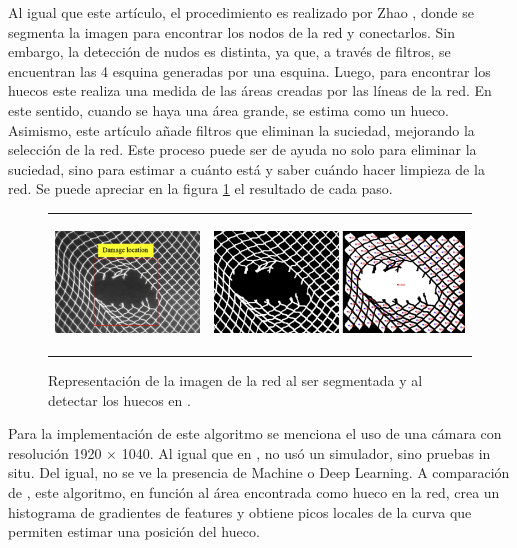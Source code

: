 Al igual que este artículo, el procedimiento es realizado por Zhao \cite{cite:Zhao}, donde se segmenta la imagen para encontrar los nodos de la red y conectarlos. Sin embargo, la detección de nudos es distinta, ya que, a través de filtros, se encuentran las 4 esquina generadas por una esquina. Luego, para encontrar los huecos este realiza una medida de las áreas creadas por las líneas de la red. En este sentido, cuando se haya una área grande, se estima como un hueco. Asimismo, este artículo añade filtros que eliminan la suciedad, mejorando la selección de la red. Este proceso puede ser de ayuda no solo para eliminar la suciedad, sino para estimar a cuánto está y saber cuándo hacer limpieza de la red. Se puede apreciar en la figura \ref{fig:Zhao_1} el resultado de cada paso. 

\begin{figure} [!h]
    \begin{center}
    \begin{tabular}{cc}
    \includegraphics[height=3.5cm]{images/Zhao_11} &
    \includegraphics[height=3.5cm]{images/Zhao_12} \\
    \end{tabular}
    \caption{\label{fig:Zhao_1}Representación de la imagen de la red al ser segmentada y al detectar los huecos en \cite{cite:Zhao}.}
    \end{center}
\end{figure}

Para la implementación de este algoritmo se menciona el uso de una cámara con resolución 1920 × 1040. Al igual que en \cite{cite:Betancourt}, no usó un simulador, sino pruebas in situ. Del igual, no se ve la presencia de Machine o Deep Learning. A comparación de \cite{cite:Betancourt}, este algoritmo, en función al área encontrada como hueco en la red, crea un histograma de gradientes de features y obtiene picos locales de la curva que permiten estimar una posición del hueco. 

